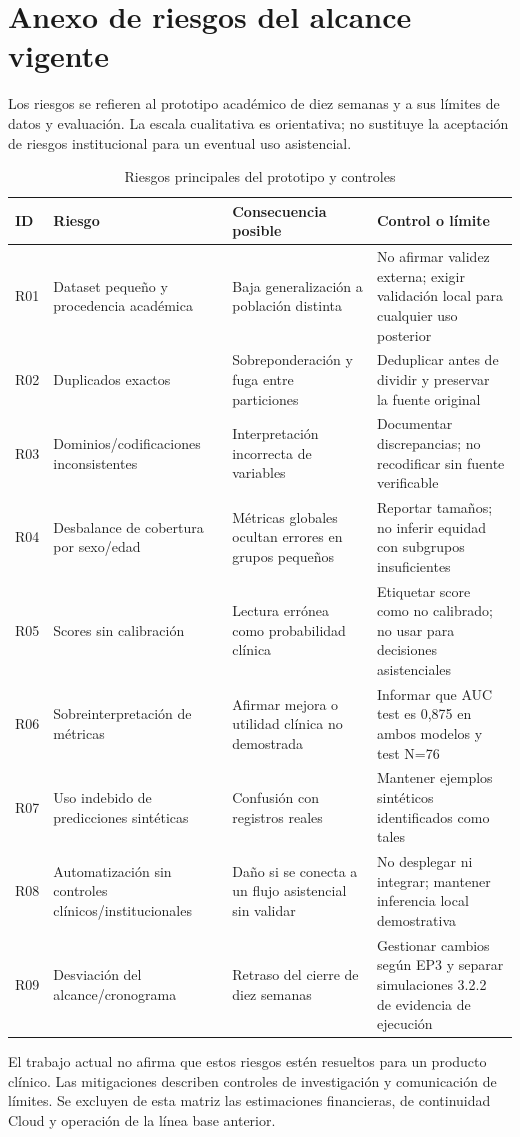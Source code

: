 \section{Anexo de riesgos del alcance vigente}

Los riesgos se refieren al prototipo académico de diez semanas y a sus límites de datos y evaluación. La escala cualitativa es orientativa; no sustituye la aceptación de riesgos institucional para un eventual uso asistencial.

\begin{table}[H]
  \centering
  \caption{Riesgos principales del prototipo y controles}
  \label{tab:riesgos-alcance-vigente}
  \small
  \begin{tabularx}{\textwidth}{@{}p{0.8cm}p{2.8cm}X X@{}}
    \toprule
    ID & Riesgo & Consecuencia posible & Control o límite \\
    \midrule
    R01 & Dataset pequeño y procedencia académica & Baja generalización a población distinta & No afirmar validez externa; exigir validación local para cualquier uso posterior \\
    R02 & Duplicados exactos & Sobreponderación y fuga entre particiones & Deduplicar antes de dividir y preservar la fuente original \\
    R03 & Dominios/codificaciones inconsistentes & Interpretación incorrecta de variables & Documentar discrepancias; no recodificar sin fuente verificable \\
    R04 & Desbalance de cobertura por sexo/edad & Métricas globales ocultan errores en grupos pequeños & Reportar tamaños; no inferir equidad con subgrupos insuficientes \\
    R05 & Scores sin calibración & Lectura errónea como probabilidad clínica & Etiquetar score como no calibrado; no usar para decisiones asistenciales \\
    R06 & Sobreinterpretación de métricas & Afirmar mejora o utilidad clínica no demostrada & Informar que AUC test es 0,875 en ambos modelos y test N=76 \\
    R07 & Uso indebido de predicciones sintéticas & Confusión con registros reales & Mantener ejemplos sintéticos identificados como tales \\
    R08 & Automatización sin controles clínicos/institucionales & Daño si se conecta a un flujo asistencial sin validar & No desplegar ni integrar; mantener inferencia local demostrativa \\
    R09 & Desviación del alcance/cronograma & Retraso del cierre de diez semanas & Gestionar cambios según EP3 y separar simulaciones 3.2.2 de evidencia de ejecución \\
    \bottomrule
  \end{tabularx}
\end{table}

El trabajo actual no afirma que estos riesgos estén resueltos para un producto clínico. Las mitigaciones describen controles de investigación y comunicación de límites. Se excluyen de esta matriz las estimaciones financieras, de continuidad Cloud y operación de la línea base anterior.
